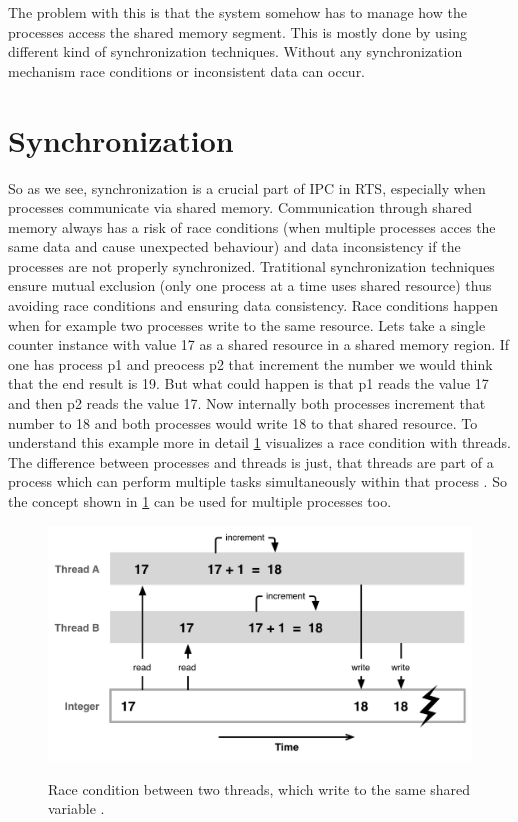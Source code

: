The problem with this is that the system somehow has to manage how the processes access the shared memory segment. This is mostly done by using different kind of synchronization techniques. Without any synchronization mechanism race conditions or inconsistent data can occur. \cite{IPCMechanisms, SharedMemory}

\section{Synchronization}\label{sec:synchronization}

So as we see, synchronization is a crucial part of \ac{IPC} in \ac{RTS}, especially when processes communicate via shared memory. Communication through shared memory always has a risk of race conditions (when multiple processes acces the same data and cause unexpected behaviour) and data inconsistency if the processes are not properly synchronized. Tratitional synchronization techniques ensure mutual exclusion (only one process at a time uses shared resource) thus avoiding race conditions and ensuring data consistency. Race conditions happen when for example two processes write to the same resource. Lets take a single counter instance with value 17 as a shared resource in a shared memory region. If one has process p1 and preocess p2 that increment the number we would think that the end result is 19. But what could happen is that p1 reads the value 17 and then p2 reads the value 17. Now internally both processes increment that number to 18 and both processes would write 18 to that shared resource. To understand this example more in detail \cref{fig:race-condition} visualizes a race condition with threads. The difference between processes and threads is just, that threads are part of a process which can perform multiple tasks simultaneously within that process \cite{DiffProcessThread}. So the concept shown in \cref{fig:race-condition} can be used for multiple processes too.

\begin{figure}[h!]
   \centering
   \captionsetup{justification=centering}
   \caption{Race condition between two threads, which write to the same shared variable \cite{Race-Condition}.}
   \includegraphics[width=115mm]{images/race-condition.png}
   \label{fig:race-condition}
\end{figure}

